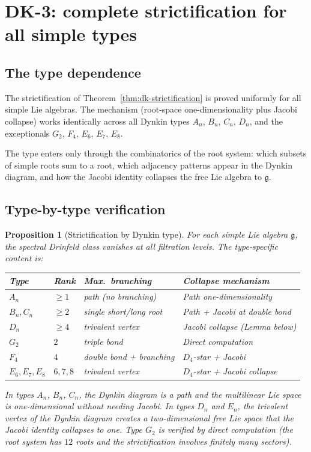 \documentclass[11pt,reqno]{amsart}
\newtheorem{proposition}[theorem]{Proposition}
\theoremstyle{definition}
\theoremstyle{remark}
\newcommand{\fg}{\mathfrak{g}}
\numberwithin{equation}{section}
\begin{document}
\section{DK-3: complete strictification for all simple types}
\label{sec:dk3}

\subsection{The type dependence}

The strictification of Theorem~\ref{thm:dk-strictification}
is proved uniformly for all simple Lie algebras.  The
mechanism (root-space one-dimensionality plus Jacobi
collapse) works identically across all Dynkin types
$A_n$, $B_n$, $C_n$, $D_n$, and the exceptionals
$G_2$, $F_4$, $E_6$, $E_7$, $E_8$.

The type enters only through the combinatorics of the
root system: which subsets of simple roots sum to a root,
which adjacency patterns appear in the Dynkin diagram, and
how the Jacobi identity collapses the free Lie algebra to
$\fg$.

\subsection{Type-by-type verification}

\begin{proposition}[Strictification by Dynkin type]
\label{prop:dk-type-verification}
For each simple Lie algebra $\fg$, the spectral Drinfeld
class vanishes at all filtration levels.
The type-specific content is:
\begin{center}
\renewcommand{\arraystretch}{1.2}
\begin{tabular}{llll}
\toprule
\textbf{Type} & \textbf{Rank} &
\textbf{Max.\ branching} &
\textbf{Collapse mechanism} \\
\midrule
$A_n$ & $\geq 1$ & path (no branching) &
 Path one-dimensionality \\
$B_n, C_n$ & $\geq 2$ & single short/long root &
 Path + Jacobi at double bond \\
$D_n$ & $\geq 4$ & trivalent vertex &
 Jacobi collapse (Lemma below) \\
$G_2$ & $2$ & triple bond &
 Direct computation \\
$F_4$ & $4$ & double bond + branching &
 $D_4$-star + Jacobi \\
$E_6, E_7, E_8$ & $6, 7, 8$ & trivalent vertex &
 $D_4$-star + Jacobi collapse \\
\bottomrule
\end{tabular}
\end{center}
In types $A_n$, $B_n$, $C_n$, the Dynkin diagram is a
path and the multilinear Lie space is one-dimensional
without needing Jacobi.  In types $D_n$ and $E_n$, the
trivalent vertex of the Dynkin diagram creates a
two-dimensional free Lie space that the Jacobi identity
collapses to one.  Type $G_2$ is verified by direct
computation (the root system has $12$ roots and the
strictification involves finitely many sectors).
\end{proposition}
\end{document}
